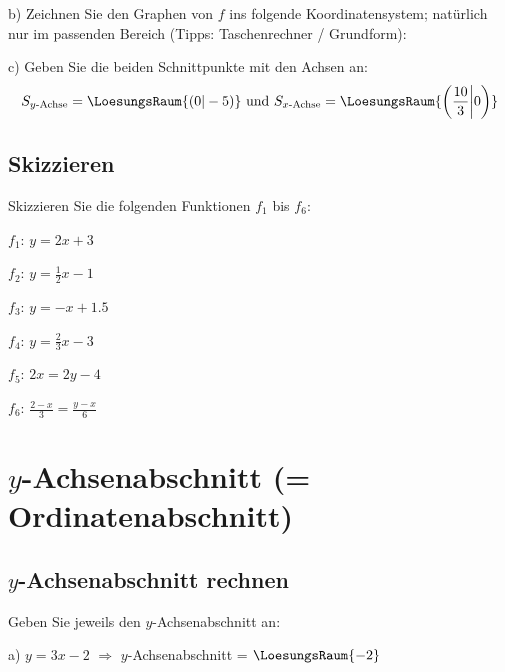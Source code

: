 b) Zeichnen Sie den Graphen von $f$ ins folgende
Koordinatensystem; natürlich nur im passenden Bereich (Tipps:
Taschenrechner / Grundform):


c) Geben Sie die beiden Schnittpunkte mit den Achsen an:
$$S_{y\text{-Achse}} = \LoesungsRaum{(0|-5)}
\text{ und }
S_{x\text{-Achse}} = \LoesungsRaum{\left(\frac{10}3 \middle| 0\right)}$$
\newpage

\subsection{Skizzieren}
Skizzieren Sie die folgenden Funktionen $f_1$ bis $f_6$:

$f_1$: $y=2x+3$



$f_2$: $y=\frac12x-1$

\newpage


$f_3$: $y=-x+1.5$




$f_4$: $y=\frac23x-3$

\newpage


$f_5$: $2x=2y-4$ 




$f_6$: $\frac{2-x}3 = \frac{y-x}6$ 

\newpage

\section{$y$-Achsenabschnitt (= Ordinatenabschnitt)}

\subsection{$y$-Achsenabschnitt rechnen}

Geben Sie jeweils den $y$-Achsenabschnitt an:

a) $y=3x-2$ $\Longrightarrow$ $y$-Achsenabschnitt =
$\LoesungsRaum{-2}$

